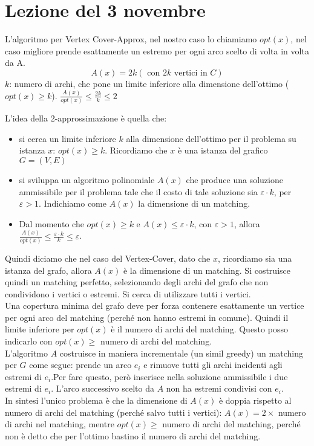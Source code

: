\section{Lezione del 3 novembre}
L’algoritmo per Vertex Cover-Approx, nel nostro caso lo chiamiamo $opt(x)$, nel caso migliore prende esattamente un estremo per ogni arco scelto di volta in volta da A.
$$A(x) = 2k (\mbox{ con } 2k \mbox{ vertici in } C)$$
$k$: numero di archi, che pone un limite inferiore alla dimensione dell’ottimo ($opt(x) \geq k$).
$\displaystyle \frac{A(x)}{opt(x)} \leq \frac{2k}{k} \leq 2$

L’idea della 2-approssimazione è quella che:
\begin{itemize}
    \item si cerca un limite inferiore $k$ alla dimensione dell’ottimo per il problema su istanza $x$: $opt(x) \geq k$. Ricordiamo che $x$ è una istanza del grafico $G = (V,E)$
    \item si sviluppa un algoritmo polinomiale $A(x)$ che produce una soluzione ammissibile per il problema tale che il costo di tale soluzione sia $\varepsilon \cdot k$, per $\varepsilon > 1$. Indichiamo come $A(x)$ la dimensione di un matching.
    \item Dal momento che $opt(x) \geq k$ e $A(x) \leq \varepsilon \cdot k$, con $\varepsilon > 1$, allora $\displaystyle \frac{A(x)}{opt(x)} \leq \frac{\varepsilon \cdot k}{k} \leq \varepsilon$.
\end{itemize}
Quindi diciamo che nel caso del Vertex-Cover, dato che $x$, ricordiamo sia una istanza del grafo, allora $A(x)$ è la dimensione di un matching. Si costruisce quindi un matching perfetto, selezionando degli archi del grafo che non condividono i vertici o estremi. Si cerca di utilizzare tutti i vertici.\\

Una copertura minima del grafo deve per forza contenere esattamente un vertice per ogni arco del matching (perché non hanno estremi in comune). Quindi il limite inferiore per $opt(x)$ è il numero di archi del matching. Questo posso indicarlo con $opt(x) \geq$ numero di archi del matching.\\
L’algoritmo $A$ costruisce in maniera incrementale (un simil greedy) un matching per $G$ come segue: prende un arco $e_i$ e rimuove tutti gli archi incidenti agli estremi di $e_i$.Per fare questo, però inserisce nella soluzione ammissibile i due estremi di $e_i$. L’arco successivo scelto da $A$ non ha estremi condivisi con $e_i$. \\ In sintesi l'unico problema è che la dimensione di $A(x)$ è doppia rispetto al numero di archi del matching (perché salvo tutti i vertici): $A(x) = 2 \times$ numero di archi nel matching, mentre $opt(x) \geq$ numero di archi del matching, perché non è detto che per l'ottimo bastino il numero di archi del matching.

